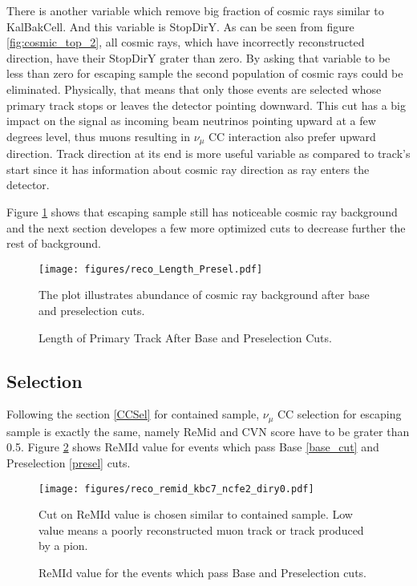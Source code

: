 There is another variable which remove big fraction of cosmic rays similar to KalBakCell. And this variable 
is StopDirY. As can be seen from figure \ref{fig:cosmic_top_2}, all cosmic rays, which have incorrectly reconstructed
direction, have their StopDirY grater than zero. By asking that variable to be less than zero for escaping 
sample the second population of cosmic rays could be eliminated. Physically, that means that only those events
are selected whose primary track stops or leaves the detector pointing downward. This cut has a big impact
on the signal as incoming beam neutrinos pointing upward at a few degrees level, thus muons resulting in $\nu_\mu$
CC interaction also prefer upward direction. Track direction at its end is more useful variable as compared to
track's start since it has information about cosmic ray direction as ray enters the detector. 

Figure \ref{fig:length_2} shows that escaping sample still has noticeable cosmic ray background and the next 
section developes a few more optimized cuts to decrease further the rest of background.

\begin{figure}[!h]
\centering
\texttt{[image: figures/reco\_Length\_Presel.pdf]}
\caption{Length of Primary Track After Base and Preselection Cuts.}
{The plot illustrates abundance of cosmic ray background after base and preselection cuts. }
\label{fig:length_2}
\end{figure}

\subsection{Selection}
Following the section \ref{CCSel} for contained sample, $\nu_\mu$ CC selection for escaping sample is exactly 
the same, namely ReMid and CVN score have to be grater than 0.5. Figure \ref{fig:remid} shows ReMId value for
events which pass Base \ref{base_cut} and Preselection \ref{presel} cuts. 
\begin{figure}[h]
\centering
\texttt{[image: figures/reco\_remid\_kbc7\_ncfe2\_diry0.pdf]}
\caption{ReMId value for the events which pass Base and Preselection cuts.}
{Cut on ReMId value is chosen similar to contained sample. Low value means a poorly reconstructed muon track or
track produced by a pion. }
\label{fig:remid}
\end{figure}


